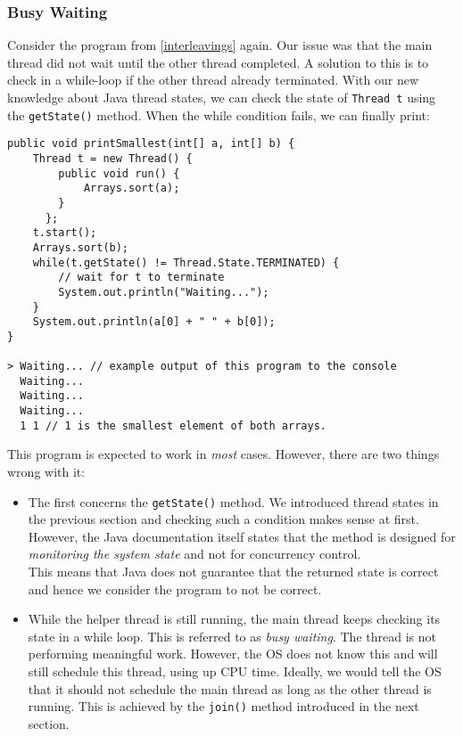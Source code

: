 \documentclass[main.tex]{subfiles}
\begin{document}
\subsubsection{Busy Waiting}
Consider the program from \ref{interleavings} again. Our issue was that the main thread did not wait until the other thread completed. A solution to this is to check in a while-loop if the other thread already terminated. With our new knowledge about Java thread states, we can check the state of \texttt{Thread t} using the \texttt{getState()} method. When the while condition fails, we can finally print:
\begin{verbatim}
public void printSmallest(int[] a, int[] b) {
    Thread t = new Thread() {
        public void run() {
            Arrays.sort(a);
        }
      };
    t.start();
    Arrays.sort(b);
    while(t.getState() != Thread.State.TERMINATED) {
        // wait for t to terminate
        System.out.println("Waiting...");
    }
    System.out.println(a[0] + " " + b[0]);
}

> Waiting... // example output of this program to the console
  Waiting...
  Waiting...
  Waiting...
  1 1 // 1 is the smallest element of both arrays.
\end{verbatim}
This program is expected to work in \textit{most} cases. However, there are two things wrong with it:
\begin{itemize}
    \item The first concerns the \texttt{getState()} method. We introduced thread states in the previous section and checking such a condition makes sense at first. However, the Java documentation itself states that the method is designed for \textit{monitoring the system state} and not for concurrency control.\\
          This means that Java does not guarantee that the returned state is correct and hence we consider the program to not be correct. %
    \item While the helper thread is still running, the main thread keeps checking its state in a while loop. This is referred to as \textit{busy waiting}. The thread is not performing meaningful work. However, the OS does not know this and will still schedule this thread, using up CPU time. Ideally, we would tell the OS that it should not schedule the main thread as long as the other thread is running. This is achieved by the \texttt{join()} method introduced in the next section.
\end{itemize}
\end{document}
